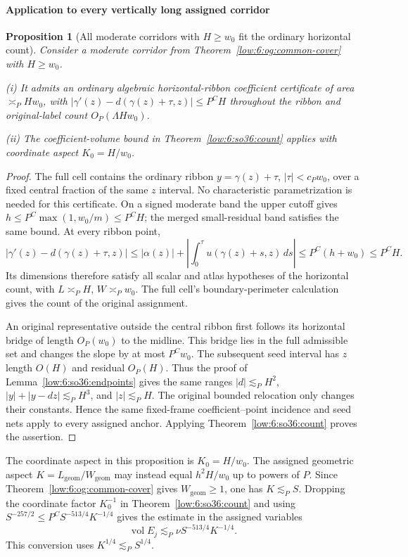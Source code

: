 \documentclass[11pt]{amsart}
\newtheorem{proposition}[theorem]{Proposition}
\theoremstyle{definition}
\theoremstyle{remark}
\numberwithin{equation}{section}
\begin{document}
\paragraph{Application to every vertically long assigned corridor}

\begin{proposition}[All moderate corridors with $H\ge w_0$ fit the ordinary horizontal count]\label{low:6:oi:z-long}
Consider a moderate corridor from Theorem~\ref{low:6:og:common-cover} with $H\ge w_0$.

\noindent\textup{(i)} It admits an ordinary algebraic horizontal-ribbon coefficient certificate of area $\asymp_P Hw_0$, with $|\gamma'(z)-d(\gamma(z)+\tau,z)|\le P^CH$ throughout the ribbon and original-label count $O_P(\Lambda Hw_0)$.

\noindent\textup{(ii)} The coefficient-volume bound in Theorem~\ref{low:6:so36:count} applies with coordinate aspect $K_0=H/w_0$.
\end{proposition}
\begin{proof}
The full cell contains the ordinary ribbon $y=\gamma(z)+\tau$, $|\tau|<c_Pw_0$, over a fixed central fraction of the same $z$ interval. No characteristic parametrization is needed for this certificate. On a signed moderate band the upper cutoff gives $h\le P^C\max(1,w_0/m)\le P^CH$; the merged small-residual band satisfies the same bound. At every ribbon point,
\[
 |\gamma'(z)-d(\gamma(z)+\tau,z)|
 \le |\alpha(z)|+\left|\int_0^\tau u(\gamma(z)+s,z)\,ds\right|
 \le P^C(h+w_0)\le P^CH.
\]
Its dimensions therefore satisfy all scalar and atlas hypotheses of the horizontal count, with $L\asymp_PH$, $W\asymp_Pw_0$. The full cell's boundary-perimeter calculation gives the count of the original assignment.

An original representative outside the central ribbon first follows its horizontal bridge of length $O_P(w_0)$ to the midline. This bridge lies in the full admissible set and changes the slope by at most $P^Cw_0$. The subsequent seed interval has $z$ length $O(H)$ and residual $O_P(H)$. Thus the proof of Lemma~\ref{low:6:so36:endpoints} gives the same ranges $|d|\lesssim_PH^2$, $|y|+|y-dz|\lesssim_PH^3$, and $|z|\lesssim_PH$. The original bounded relocation only changes their constants. Hence the same fixed-frame coefficient--point incidence and seed nets apply to every assigned anchor. Applying Theorem~\ref{low:6:so36:count} proves the assertion.
\end{proof}

The coordinate aspect in this proposition is $K_0=H/w_0$. The assigned geometric aspect $K=L_{\mathrm{geom}}/W_{\mathrm{geom}}$ may instead equal $h^2H/w_0$ up to powers of $P$. Since Theorem~\ref{low:6:og:common-cover} gives $W_{\mathrm{geom}}\ge1$, one has $K\lesssim_PS$. Dropping the coordinate factor $K_0^{-1}$ in Theorem~\ref{low:6:so36:count} and using $S^{-257/2}\le P^CS^{-513/4}K^{-1/4}$ gives the estimate in the assigned variables
\begin{equation}\label{low:6:as36:zlong-assigned}
\operatorname{vol}E_j\lesssim_P\nu S^{-513/4}K^{-1/4}.
\end{equation}
This conversion uses $K^{1/4}\lesssim_PS^{1/4}$.
\end{document}
